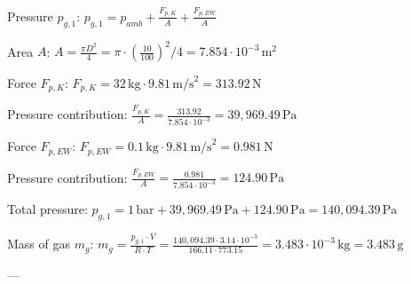 Pressure \( p_{g,1} \):  
\( p_{g,1} = p_{amb} + \frac{F_{p,K}}{A} + \frac{F_{p,EW}}{A} \)  

Area \( A \):  
\( A = \frac{\pi D^2}{4} = \pi \cdot \left( \frac{10}{100} \right)^2 / 4 = 7.854 \cdot 10^{-3} \, \text{m}^2 \)  

Force \( F_{p,K} \):  
\( F_{p,K} = 32 \, \text{kg} \cdot 9.81 \, \text{m/s}^2 = 313.92 \, \text{N} \)  

Pressure contribution:  
\( \frac{F_{p,K}}{A} = \frac{313.92}{7.854 \cdot 10^{-3}} = 39,969.49 \, \text{Pa} \)  

Force \( F_{p,EW} \):  
\( F_{p,EW} = 0.1 \, \text{kg} \cdot 9.81 \, \text{m/s}^2 = 0.981 \, \text{N} \)  

Pressure contribution:  
\( \frac{F_{p,EW}}{A} = \frac{0.981}{7.854 \cdot 10^{-3}} = 124.90 \, \text{Pa} \)  

Total pressure:  
\( p_{g,1} = 1 \, \text{bar} + 39,969.49 \, \text{Pa} + 124.90 \, \text{Pa} = 140,094.39 \, \text{Pa} \)  

Mass of gas \( m_g \):  
\( m_g = \frac{p_{g,1} \cdot V}{R \cdot T} = \frac{140,094.39 \cdot 3.14 \cdot 10^{-3}}{166.11 \cdot 773.15} = 3.483 \cdot 10^{-3} \, \text{kg} = 3.483 \, \text{g} \)  

---